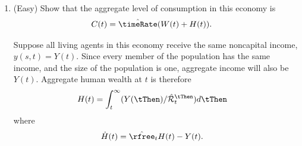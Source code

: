 \documentclass{handout}
\begin{document}
\begin{enumerate}
\item (Easy) Show that the aggregate level of consumption in 
this economy is
\begin{equation}\begin{gathered}\begin{aligned}
        C(t) & =  \hat{\timeRate} (W(t) + H(t)) . \label{eq:cagg}
\end{aligned}\end{gathered}\end{equation}


Suppose all living agents in this economy receive the same noncapital 
income, $y(s,t) = Y(t)$.  Since every member of the population has the 
same income, and the size of the population is one, aggregate income 
will also be $Y(t)$.  Aggregate human wealth at $t$ is therefore
\begin{equation}\begin{gathered}\begin{aligned}
        H(t) & =  \int_{t}^{\infty} (Y(\tThen)/\hat{\mathcal{R}}_{t}^{\tThen}) d\tThen
\end{aligned}\end{gathered}\end{equation}
where 
\begin{equation}\begin{gathered}\begin{aligned}
        \dot{H}(t) & =  \hat{\rfree}_{t} H(t) - Y(t) .
\end{aligned}\end{gathered}\end{equation}


\end{enumerate}
\end{document}
